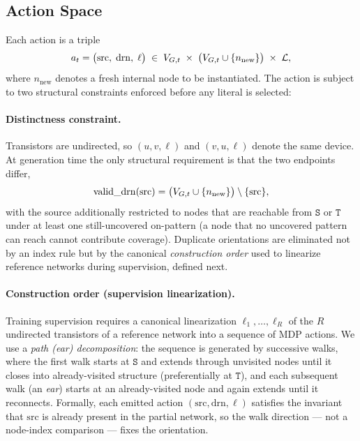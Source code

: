 \documentclass[11pt, a4paper]{article}
\theoremstyle{plain}
\theoremstyle{definition}
\theoremstyle{remark}
\newcommand{\SOURCE}{\texttt{S}}
\newcommand{\SINK}{\texttt{T}}
\newcommand{\VG}[1][]{V_{G\if\relax\detokenize{#1}\relax\else,#1\fi}}
\newcommand{\nnew}{n_{\mathrm{new}}}
\begin{document}
\subsection{Action Space}

Each action is a triple
\[
  a_t = \bigl(\mathrm{src},\;\mathrm{drn},\;\ell\bigr)
  \;\in\;
  \VG[t] \;\times\; \bigl(\VG[t] \cup \{\nnew\}\bigr)
  \;\times\; \mathcal{L},
\]
where $\nnew$ denotes a fresh internal node to be instantiated.
The action is subject to two structural constraints enforced before
any literal is selected:

\paragraph{Distinctness constraint.}
Transistors are undirected, so $(u,v,\ell)$ and $(v,u,\ell)$ denote the
same device.  At generation time the only structural requirement is that
the two endpoints differ,
\[
  \mathrm{valid\_drn}(\mathrm{src})
  = \bigl(\VG[t] \cup \{\nnew\}\bigr) \setminus \{\mathrm{src}\},
\]
with the source additionally restricted to nodes that are reachable from
$\SOURCE$ or $\SINK$ under at least one still-uncovered on-pattern
(a node that no uncovered pattern can reach cannot contribute coverage).
Duplicate orientations are eliminated not by an index rule but by the
canonical \emph{construction order} used to linearize reference networks
during supervision, defined next.

\paragraph{Construction order (supervision linearization).}
\label{par:order}
Training supervision requires a canonical linearization
$\ell_1,\dots,\ell_R$ of the $R$ undirected transistors of a reference
network into a sequence of MDP actions.  We use a \emph{path (ear)
decomposition}: the sequence is generated by successive walks, where the
first walk starts at $\SOURCE$ and extends through unvisited nodes until
it closes into already-visited structure (preferentially at $\SINK$),
and each subsequent walk (an \emph{ear}) starts at an already-visited
node and again extends until it reconnects.  Formally, each emitted
action $(\mathrm{src},\mathrm{drn},\ell)$ satisfies the invariant that
$\mathrm{src}$ is already present in the partial network, so the walk
direction — not a node-index comparison — fixes the orientation.
\end{document}
